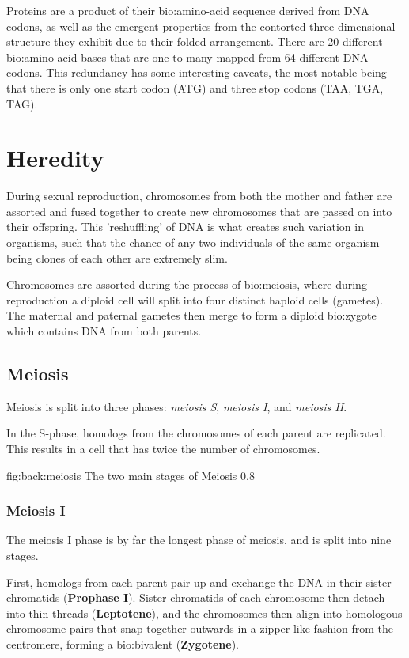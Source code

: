 Proteins are a product of their \gls{bio:amino-acid} sequence derived from DNA codons, as well as the emergent properties from the contorted three dimensional structure they exhibit due to their folded arrangement.  There are 20 different \gls{bio:amino-acid} bases that are one-to-many mapped from 64 different DNA codons. This redundancy has some interesting caveats, the most notable being that there is only one start codon (ATG) and three stop codons (TAA, TGA, TAG).

\section{Heredity}

During sexual reproduction, chromosomes from both the mother and father are assorted and fused together to create new chromosomes that are passed on into their offspring. This 'reshuffling' of DNA is what creates such variation in organisms, such that the chance of any two individuals of the same organism being clones of each other are extremely slim.

Chromosomes are assorted during the process of \gls{bio:meiosis}, where during reproduction a diploid cell will split into four distinct haploid cells (gametes). The maternal and paternal gametes then merge to form a diploid \gls{bio:zygote} which contains DNA from both parents.


\subsection{Meiosis}

Meiosis is split into three phases: \textit{meiosis S}, \textit{meiosis I}, and \textit{meiosis II}. 

In the S-phase, homologs from the chromosomes of each parent are replicated. This results in a cell that has twice the number of chromosomes.

{fig:back:meiosis}
{The two main stages of Meiosis}
{0.8}
{}



\subsubsection{Meiosis I}

The meiosis I phase is by far the longest phase of meiosis, and is split into nine stages. 

First, homologs from each parent pair up and exchange the DNA in their sister chromatids (\textbf{Prophase I}).  Sister chromatids of each chromosome then detach into thin threads (\textbf{Leptotene}), and the chromosomes then align into homologous chromosome pairs that snap together outwards in a zipper-like fashion from the centromere, forming a \gls{bio:bivalent} (\textbf{Zygotene}). 

